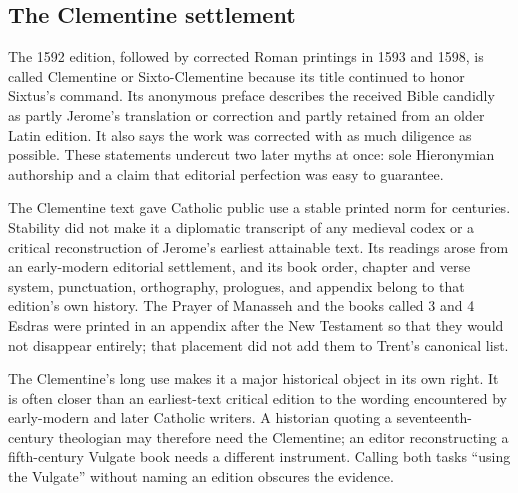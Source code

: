 \subsection{The Clementine settlement}

The 1592 edition, followed by corrected Roman printings in 1593 and 1598, is called Clementine or Sixto-Clementine because its title continued to honor Sixtus's command. Its anonymous preface describes the received Bible candidly as partly Jerome's translation or correction and partly retained from an older Latin edition. It also says the work was corrected with as much diligence as possible. These statements undercut two later myths at once: sole Hieronymian authorship and a claim that editorial perfection was easy to guarantee.

The Clementine text gave Catholic public use a stable printed norm for centuries. Stability did not make it a diplomatic transcript of any medieval codex or a critical reconstruction of Jerome's earliest attainable text. Its readings arose from an early-modern editorial settlement, and its book order, chapter and verse system, punctuation, orthography, prologues, and appendix belong to that edition's own history. The Prayer of Manasseh and the books called 3 and 4 Esdras were printed in an appendix after the New Testament so that they would not disappear entirely; that placement did not add them to Trent's canonical list.


The Clementine's long use makes it a major historical object in its own right. It is often closer than an earliest-text critical edition to the wording encountered by early-modern and later Catholic writers. A historian quoting a seventeenth-century theologian may therefore need the Clementine; an editor reconstructing a fifth-century Vulgate book needs a different instrument. Calling both tasks ``using the Vulgate'' without naming an edition obscures the evidence.
